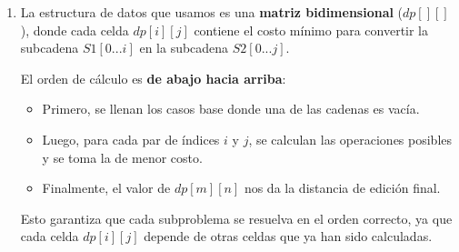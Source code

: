 \begin{enumerate}[1)]
    
    \item La estructura de datos que usamos es una \textbf{matriz bidimensional} ($dp[][]$), donde cada celda $dp[i][j]$ contiene el costo mínimo para convertir la subcadena $S1[0...i]$ en la subcadena $S2[0...j]$.

El orden de cálculo es \textbf{de abajo hacia arriba}:
\begin{itemize}
    \item Primero, se llenan los casos base donde una de las cadenas es vacía.
    \item Luego, para cada par de índices $i$ y $j$, se calculan las operaciones posibles y se toma la de menor costo.
    \item Finalmente, el valor de $dp[m][n]$ nos da la distancia de edición final.
\end{itemize}

Esto garantiza que cada subproblema se resuelva en el orden correcto, ya que cada celda $dp[i][j]$ depende de otras celdas que ya han sido calculadas.
\end{enumerate}

